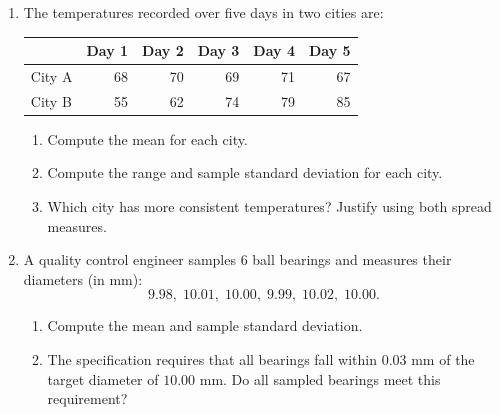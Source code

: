 \begin{enumerate}[label=R\arabic*.,leftmargin=2.5em,itemsep=10pt]
  \item The temperatures recorded over five days in two
    cities are:
    \begin{center}
    \renewcommand{\arraystretch}{1.4}
    \begin{tabular}{lrrrrr}
    \toprule
    & Day 1 & Day 2 & Day 3 & Day 4 & Day 5 \\
    \midrule
    City A & 68 & 70 & 69 & 71 & 67 \\
    City B & 55 & 62 & 74 & 79 & 85 \\
    \bottomrule
    \end{tabular}
    \end{center}
    \begin{enumerate}[label=(\alph*), itemsep=4pt]
      \item Compute the mean for each city.
      \item Compute the range and sample standard deviation
        for each city.
      \item Which city has more consistent temperatures?
        Justify using both spread measures.
    \end{enumerate}

  \item A quality control engineer samples 6 ball bearings
    and measures their diameters (in mm):
    \[ 9.98,\; 10.01,\; 10.00,\; 9.99,\; 10.02,\; 10.00. \]
    \begin{enumerate}[label=(\alph*), itemsep=4pt]
      \item Compute the mean and sample standard deviation.
      \item The specification requires that all bearings
        fall within $0.03$ mm of the target diameter of
        $10.00$ mm. Do all sampled bearings meet this
        requirement?
    \end{enumerate}

\end{enumerate}
